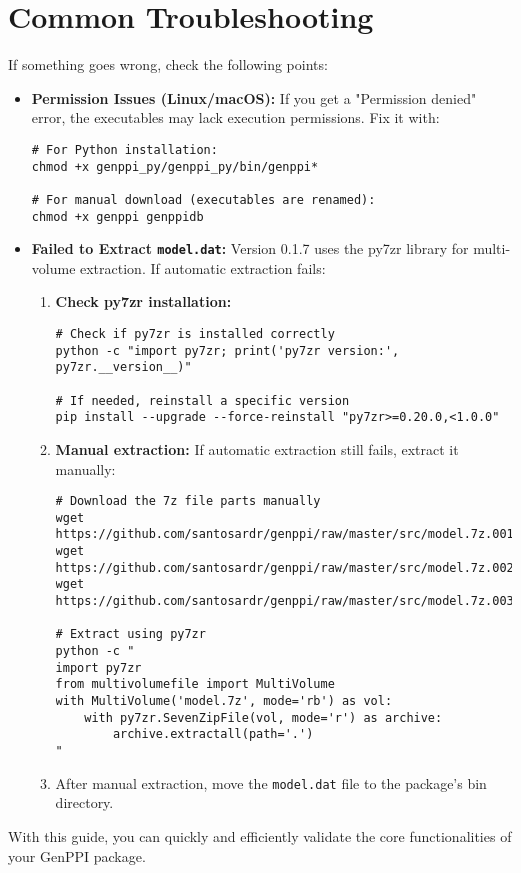 \documentclass[11pt, a4paper]{article}
\begin{document}
\section{Common Troubleshooting}
If something goes wrong, check the following points:
\begin{itemize}
    \item \textbf{Permission Issues (Linux/macOS):} If you get a "Permission denied" error, the executables may lack execution permissions. Fix it with:
    \begin{lstlisting}[style=bashstyle]
# For Python installation:
chmod +x genppi_py/genppi_py/bin/genppi*

# For manual download (executables are renamed):
chmod +x genppi genppidb
    \end{lstlisting}
    
    \item \textbf{Failed to Extract \texttt{model.dat}:} Version 0.1.7 uses the py7zr library for multi-volume extraction. If automatic extraction fails:
    \begin{enumerate}
        \item \textbf{Check py7zr installation:}
        \begin{lstlisting}[style=bashstyle]
# Check if py7zr is installed correctly
python -c "import py7zr; print('py7zr version:', py7zr.__version__)"

# If needed, reinstall a specific version
pip install --upgrade --force-reinstall "py7zr>=0.20.0,<1.0.0"
        \end{lstlisting}
        
        \item \textbf{Manual extraction:} If automatic extraction still fails, extract it manually:
        \begin{lstlisting}[style=bashstyle]
# Download the 7z file parts manually
wget https://github.com/santosardr/genppi/raw/master/src/model.7z.001
wget https://github.com/santosardr/genppi/raw/master/src/model.7z.002
wget https://github.com/santosardr/genppi/raw/master/src/model.7z.003

# Extract using py7zr
python -c "
import py7zr
from multivolumefile import MultiVolume
with MultiVolume('model.7z', mode='rb') as vol:
    with py7zr.SevenZipFile(vol, mode='r') as archive:
        archive.extractall(path='.')
"
        \end{lstlisting}
        
        \item After manual extraction, move the \texttt{model.dat} file to the package's bin directory.
    \end{enumerate}
\end{itemize}

With this guide, you can quickly and efficiently validate the core functionalities of your GenPPI package.
\end{document}
